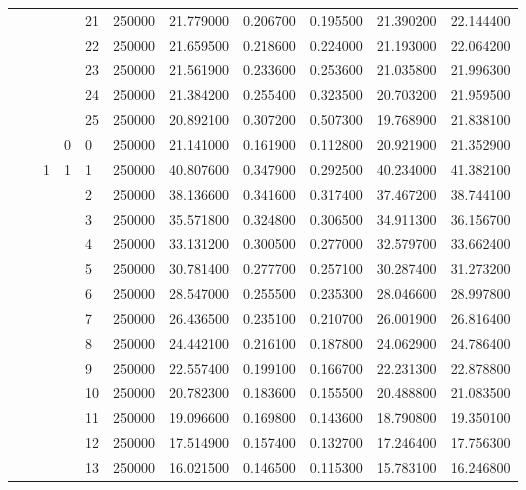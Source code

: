 \begin{tabular}{llllllrrrrr}
\cline{5-11}
 &  &  &  & 21 & 250000 & 21.779000 & 0.206700 & 0.195500 & 21.390200 & 22.144400 \\
\cline{5-11}
 &  &  &  & 22 & 250000 & 21.659500 & 0.218600 & 0.224000 & 21.193000 & 22.064200 \\
\cline{5-11}
 &  &  &  & 23 & 250000 & 21.561900 & 0.233600 & 0.253600 & 21.035800 & 21.996300 \\
\cline{5-11}
 &  &  &  & 24 & 250000 & 21.384200 & 0.255400 & 0.323500 & 20.703200 & 21.959500 \\
\cline{5-11}
 &  &  &  & 25 & 250000 & 20.892100 & 0.307200 & 0.507300 & 19.768900 & 21.838100 \\
\cline{4-11} \cline{5-11}
 &  &  & 0 & 0 & 250000 & 21.141000 & 0.161900 & 0.112800 & 20.921900 & 21.352900 \\
\cline{3-11} \cline{4-11} \cline{5-11}
 &  & \multirow[t]{101}{*}{1} & \multirow[t]{25}{*}{1} & 1 & 250000 & 40.807600 & 0.347900 & 0.292500 & 40.234000 & 41.382100 \\
\cline{5-11}
 &  &  &  & 2 & 250000 & 38.136600 & 0.341600 & 0.317400 & 37.467200 & 38.744100 \\
\cline{5-11}
 &  &  &  & 3 & 250000 & 35.571800 & 0.324800 & 0.306500 & 34.911300 & 36.156700 \\
\cline{5-11}
 &  &  &  & 4 & 250000 & 33.131200 & 0.300500 & 0.277000 & 32.579700 & 33.662400 \\
\cline{5-11}
 &  &  &  & 5 & 250000 & 30.781400 & 0.277700 & 0.257100 & 30.287400 & 31.273200 \\
\cline{5-11}
 &  &  &  & 6 & 250000 & 28.547000 & 0.255500 & 0.235300 & 28.046600 & 28.997800 \\
\cline{5-11}
 &  &  &  & 7 & 250000 & 26.436500 & 0.235100 & 0.210700 & 26.001900 & 26.816400 \\
\cline{5-11}
 &  &  &  & 8 & 250000 & 24.442100 & 0.216100 & 0.187800 & 24.062900 & 24.786400 \\
\cline{5-11}
 &  &  &  & 9 & 250000 & 22.557400 & 0.199100 & 0.166700 & 22.231300 & 22.878800 \\
\cline{5-11}
 &  &  &  & 10 & 250000 & 20.782300 & 0.183600 & 0.155500 & 20.488800 & 21.083500 \\
\cline{5-11}
 &  &  &  & 11 & 250000 & 19.096600 & 0.169800 & 0.143600 & 18.790800 & 19.350100 \\
\cline{5-11}
 &  &  &  & 12 & 250000 & 17.514900 & 0.157400 & 0.132700 & 17.246400 & 17.756300 \\
\cline{5-11}
 &  &  &  & 13 & 250000 & 16.021500 & 0.146500 & 0.115300 & 15.783100 & 16.246800 \\

\end{tabular}
